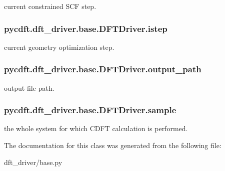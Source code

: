 current constrained S\-C\-F step. 

\hypertarget{classpycdft_1_1dft__driver_1_1base_1_1DFTDriver_a3e625b48fda9b8df72ebcea0a7dfc6f8}{
\subsubsection[{istep}]{\setlength{\rightskip}{0pt plus 5cm}pycdft.\-dft\-\_\-driver.\-base.\-D\-F\-T\-Driver.\-istep}}\label{classpycdft_1_1dft__driver_1_1base_1_1DFTDriver_a3e625b48fda9b8df72ebcea0a7dfc6f8}


current geometry optimization step. 

\hypertarget{classpycdft_1_1dft__driver_1_1base_1_1DFTDriver_a2f65382d24cd1e2935498a1c573b5ce5}{
\subsubsection[{output\-\_\-path}]{\setlength{\rightskip}{0pt plus 5cm}pycdft.\-dft\-\_\-driver.\-base.\-D\-F\-T\-Driver.\-output\-\_\-path}}\label{classpycdft_1_1dft__driver_1_1base_1_1DFTDriver_a2f65382d24cd1e2935498a1c573b5ce5}


output file path. 

\hypertarget{classpycdft_1_1dft__driver_1_1base_1_1DFTDriver_ab58cf26b641c0ab31afcef18f4e0baca}{
\subsubsection[{sample}]{\setlength{\rightskip}{0pt plus 5cm}pycdft.\-dft\-\_\-driver.\-base.\-D\-F\-T\-Driver.\-sample}}\label{classpycdft_1_1dft__driver_1_1base_1_1DFTDriver_ab58cf26b641c0ab31afcef18f4e0baca}


the whole system for which C\-D\-F\-T calculation is performed. 



The documentation for this class was generated from the following file\-:\begin{DoxyCompactItemize}
\item 
dft\-\_\-driver/base.\-py\end{DoxyCompactItemize}
